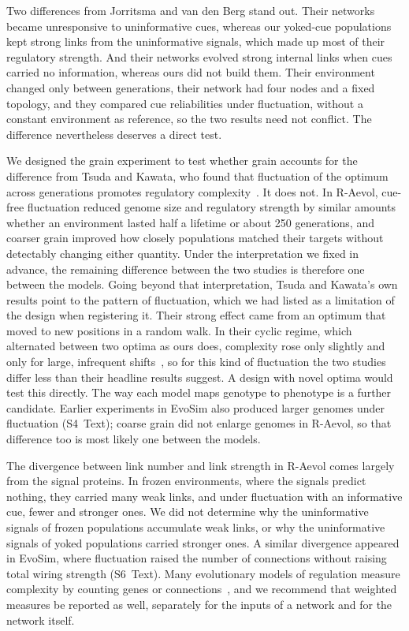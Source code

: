 \documentclass[10pt,letterpaper]{article}
\begin{document}
Two differences from Jorritsma and van den Berg stand out. Their networks became
unresponsive to uninformative cues, whereas our yoked-cue populations kept strong
links from the uninformative signals, which made up most of their regulatory
strength. And their networks evolved strong internal links when cues carried no
information, whereas ours did not build them. Their environment changed only between
generations, their network had four nodes and a fixed topology, and they
compared cue reliabilities under fluctuation, without a constant environment as
reference, so the two results need not conflict. The difference nevertheless
deserves a direct test.

We designed the grain experiment to test whether grain accounts for the
difference from Tsuda and Kawata, who found that fluctuation of the optimum
across generations promotes regulatory complexity~\cite{tsuda2010}. It does not.
In R-Aevol, cue-free fluctuation reduced genome size and regulatory strength by
similar amounts whether an environment lasted half a lifetime or about 250
generations, and coarser grain improved how closely populations matched their
targets without detectably changing either quantity. Under the interpretation
we fixed in advance, the remaining difference between the two studies is
therefore one between the models. Going beyond that interpretation, Tsuda and
Kawata's own results point to the pattern of fluctuation, which we had listed as
a limitation of the design when registering it. Their strong effect came from an
optimum that moved to new positions in a random walk. In their cyclic regime,
which alternated between two optima as ours does, complexity rose only slightly
and only for large, infrequent shifts~\cite{tsuda2010}, so for this kind of
fluctuation the two studies differ less than their headline results suggest. A
design with novel optima would test this directly. The way each model maps
genotype to phenotype is a further candidate. Earlier experiments in EvoSim also
produced larger genomes under fluctuation (S4~Text); coarse grain did not enlarge
genomes in R-Aevol, so that difference too is most likely one between the models.

The divergence between link number and link strength in R-Aevol comes largely
from the signal proteins. In frozen environments, where the signals predict
nothing, they carried many weak links, and under fluctuation with an informative
cue, fewer and stronger ones. We did not determine why the uninformative signals
of frozen populations accumulate weak links, or why the uninformative signals of
yoked populations carried stronger ones. A similar divergence appeared in EvoSim,
where fluctuation raised the number of connections without raising total wiring
strength (S6~Text). Many evolutionary models of regulation measure complexity by
counting genes or connections~\cite{tsuda2010,espinosasoto2018}, and we recommend
that weighted measures be reported as well, separately for the inputs of a
network and for the network itself.
\end{document}
